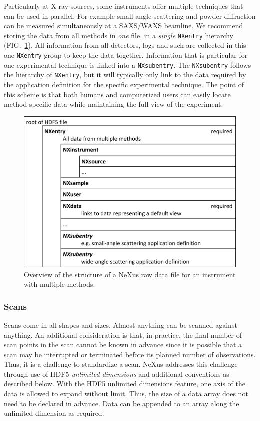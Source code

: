 \documentclass[%
 aip,
rsi,
 amsmath,amssymb,
 reprint,%
]{revtex4-1}
\begin{document}
Particularly at X-ray sources,
some instruments offer multiple techniques that can be used in parallel.
For example small-angle scattering and powder diffraction 
can be measured simultaneously at a SAXS/WAXS beamline.
We recommend storing the data from all methods in \emph{one} file,
in a \emph{single} \texttt{NXentry} hierarchy
(FIG.~\ref{multimethod}). All information from all detectors, logs and 
such are collected in this one \texttt{NXentry} group to keep the data together.
Information that is particular for one experimental technique
is linked  into a \texttt{NXsubentry}. The \texttt{NXsubentry} follows the hierarchy of 
\texttt{NXentry}, but it will typically only link to the data required by the 
application definition for the specific experimental technique. The point of this scheme 
is that both humans and computerized users can easily locate method-specific data while 
maintaining the full view of the experiment.   

\begin{figure}
\includegraphics[width=\columnwidth]{figure2}
\caption{\label{multimethod}Overview of the structure of a NeXus raw data file for an instrument with multiple methods.}
\end{figure}

\subsubsection{Scans}

Scans come in all shapes and sizes. Almost anything can be scanned against anything. 
An additional consideration is that, in practice, the final number of scan points in the scan 
cannot be known in advance since it is possible that a scan may be interrupted or terminated
before its planned number of observations. 
Thus, it is a challenge to standardize a scan.
NeXus addresses this challenge through use of HDF5 \emph{unlimited dimensions} and
additional conventions as described below.
With the HDF5 
unlimited dimensions feature, one axis of the data is allowed to expand without limit.  
Thus, the size of a data array does not need to be declared in advance. 
Data can be appended to an array along the unlimited dimension as required. 
\end{document}
